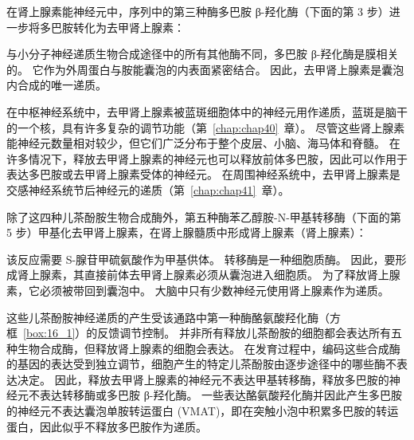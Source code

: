 在肾上腺素能神经元中，序列中的第三种酶多巴胺 β-羟化酶（下面的第 3 步）进一步将多巴胺转化为去甲肾上腺素：


与小分子神经递质生物合成途径中的所有其他酶不同，多巴胺 β-羟化酶是膜相关的。
它作为外周蛋白与胺能囊泡的内表面紧密结合。
因此，去甲肾上腺素是囊泡内合成的唯一递质。


在中枢神经系统中，去甲肾上腺素被蓝斑细胞体中的神经元用作递质，蓝斑是脑干的一个核，具有许多复杂的调节功能（第~\ref{chap:chap40}~章）。
尽管这些肾上腺素能神经元数量相对较少，但它们广泛分布于整个皮层、小脑、海马体和脊髓。
在许多情况下，释放去甲肾上腺素的神经元也可以释放前体多巴胺，因此可以作用于表达多巴胺或去甲肾上腺素受体的神经元。
在周围神经系统中，去甲肾上腺素是交感神经系统节后神经元的递质（第~\ref{chap:chap41}~章）。


除了这四种儿茶酚胺生物合成酶外，第五种酶苯乙醇胺-N-甲基转移酶（下面的第 5 步）甲基化去甲肾上腺素，在肾上腺髓质中形成肾上腺素（肾上腺素）：


该反应需要 S-腺苷甲硫氨酸作为甲基供体。
转移酶是一种细胞质酶。
因此，要形成肾上腺素，其直接前体去甲肾上腺素必须从囊泡进入细胞质。
为了释放肾上腺素，它必须被带回到囊泡中。
大脑中只有少数神经元使用肾上腺素作为递质。


这些儿茶酚胺神经递质的产生受该通路中第一种酶酪氨酸羟化酶（方框~\ref{box:16_1}）的反馈调节控制。
并非所有释放儿茶酚胺的细胞都会表达所有五种生物合成酶，但释放肾上腺素的细胞会表达。
在发育过程中，编码这些合成酶的基因的表达受到独立调节，细胞产生的特定儿茶酚胺由逐步途径中的哪些酶不表达决定。
因此，释放去甲肾上腺素的神经元不表达甲基转移酶，释放多巴胺的神经元不表达转移酶或多巴胺 β-羟化酶。
一些表达酪氨酸羟化酶并因此产生多巴胺的神经元不表达囊泡单胺转运蛋白 (VMAT)，即在突触小泡中积累多巴胺的转运蛋白，因此似乎不释放多巴胺作为递质。


